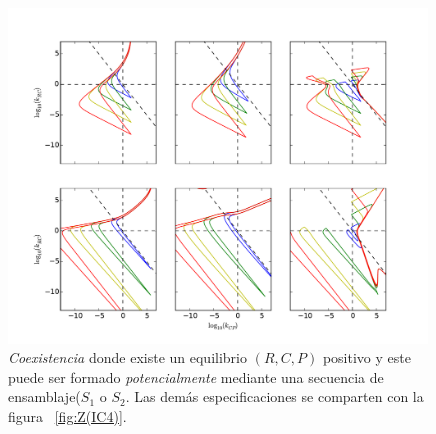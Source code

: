 \begin{figure}
  \centering
  \includegraphics[width = 0.99\textwidth]{./Plots/CoexistenceAcGrGr.pdf}
  \caption[Env $Coexistencia$]{\emph{Coexistencia} donde existe un equilibrio $(R,C,P)$ positivo y este puede ser formado \emph{potencialmente} mediante una secuencia de ensamblaje($S_1$ o $S_2$. Las dem\'as especificaciones se comparten con la figura ~\ref{fig:Z(IC4)}.}
  \label{fig:PSCoexistence}
\end{figure}


